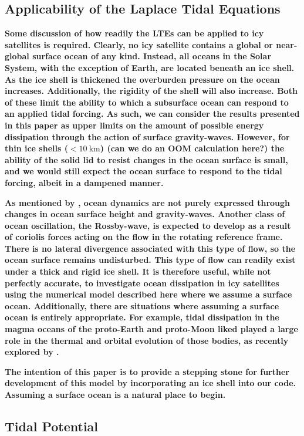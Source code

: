\subsection{\textbf{Applicability of the Laplace Tidal Equations} \label{subsec:applicability}}

\textbf{Some discussion of how readily the LTEs can be applied to icy satellites is required. Clearly, no icy satellite contains a global or near-global surface ocean of any kind. Instead, all oceans in the Solar System, with the exception of Earth, are located beneath an ice shell. As the ice shell is thickened the overburden pressure on the ocean increases. Additionally, the rigidity of the shell will also increase. Both of these limit the ability to which a subsurface ocean can respond to an applied tidal forcing. As such, we can consider the results presented in this paper as upper limits on the amount of possible energy dissipation through the action of surface gravity-waves. However, for thin ice shells ($<\SI{10}{\kilo\metre}$) (can we do an OOM calculation here?) the ability of the solid lid to resist changes in the ocean surface is small, and we would still expect the ocean surface to respond to the tidal forcing, albeit in a dampened manner.}   

\textbf{As mentioned by \citet{tyler2008strong}, ocean dynamics are not purely expressed through changes in ocean surface height and gravity-waves. Another class of ocean oscillation, the Rossby-wave, is expected to develop as a result of coriolis forces acting on the flow in the rotating reference frame. There is no lateral divergence associated with this type of flow, so  the ocean surface remains undisturbed. This type of flow can readily exist under a thick and rigid ice shell. It is therefore useful, while not perfectly accurate, to investigate ocean dissipation in icy satellites using the numerical model described here where we assume a surface ocean. Additionally, there are situations where assuming a surface ocean is entirely appropriate. For example, tidal dissipation in the magma oceans of the proto-Earth and proto-Moon liked played a large role in the thermal and orbital evolution of those bodies, as recently explored by \citet{chen2016tidal}.}

\textbf{The intention of this paper is to provide a stepping stone for further development of this model by incorporating an ice shell into our code. Assuming a surface ocean is a natural place to begin.}


\subsection{Tidal Potential \label{subsec:pot}}

